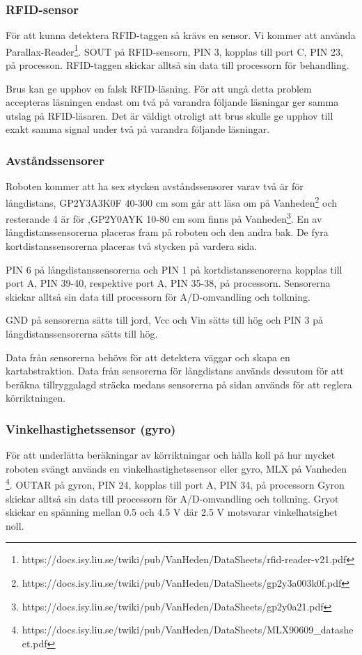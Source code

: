 \documentclass[a4paper,12pt,fleqn]{article}
\begin{document}
\subsubsection{RFID-sensor}
För att kunna detektera RFID-taggen så krävs en sensor. Vi kommer att använda Par\-all\-ax-Read\-er\footnote{https://docs.isy.liu.se/twiki/pub/VanHeden/DataSheets/rfid-reader-v21.pdf}. 
SOUT på RFID-sensorn, PIN 3, kopplas till port C, PIN 23, på processon. RFID-taggen skickar alltså sin data till processorn för behandling.

Brus kan ge upphov en falsk RFID-läsning. För att ungå detta problem accepteras läsningen endast om två på varandra följande läsningar ger samma utslag på RFID-läsaren. Det är väldigt otroligt att brus skulle ge upphov till exakt samma signal under två på varandra följande läsningar.

\subsubsection{Avståndssensorer}
Roboten kommer att ha sex stycken av\-stånds\-sensorer varav två är för lång\-distans, GP\-2Y3A\-3K\-0F 40-300 cm som går att läsa om på Vanheden\footnote{https://docs.isy.liu.se/twiki/pub/VanHeden/DataSheets/gp2y3a003k0f.pdf}  och resterande 4 är för ,GP\-2Y\-0A\-YK 10-80 cm som finns på Vanheden\footnote{https://docs.isy.liu.se/twiki/pub/VanHeden/DataSheets/gp2y0a21.pdf}. En av långdistanssensorerna placeras fram på roboten och den andra bak. De fyra kortdistanssensorerna placeras två stycken på vardera sida.

PIN 6 på långdistanssensorerna och PIN 1 på kortdistanssenorerna kopplas till port A, PIN 39-40, respektive port A, PIN 35-38, på processorn. Sensorerna skickar alltså sin data till processorn för A/D-omvandling och tolkning.

GND på sensorerna sätts till jord, Vcc och Vin sätts till hög och PIN 3 på långdistanssensorerna sätts till hög.
 
Data från sensorerna behövs för att detektera väggar och skapa en kartabstraktion. Data från sensorerna för långdistans används dessutom för att beräkna tillryggalagd sträcka medans sensorerna på sidan används för att reglera körriktningen.

\subsubsection{Vinkelhastighetssensor (gyro)}
För att underlätta beräkningar av körriktningar och hålla koll på hur mycket roboten svängt används en vinkelhastighetssensor eller gyro, MLX på Vanheden \footnote{https://docs.isy.liu.se/twiki/pub/VanHeden/DataSheets/MLX90609\_datasheet.pdf}. OUTAR på gyron, PIN 24, kopplas till port A, PIN 34, på processorn Gyron skickar alltså sin data till processorn för A/D-omvandling och tolkning. Gryot skickar en spänning mellan 0.5 och 4.5 V där 2.5 V motsvarar vinkelhatsighet noll.
\end{document}
